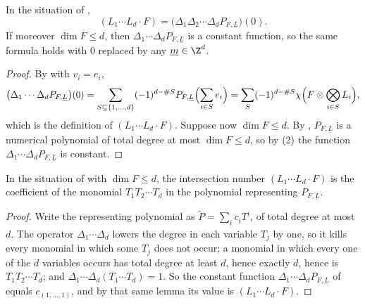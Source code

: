 \begin{lemma}\label{lem:deg-intersection-is-top-difference}
In the situation of ,
\[
  (L_1\cdots L_d\cdot F)=
  \bigl(\Delta_1\Delta_2\cdots\Delta_dP_{F,\underline L}\bigr)(0).
\]
If moreover $\dim F\leq d$, then $\Delta_1\cdots\Delta_dP_{F,\underline L}$ is
a constant function, so the same formula holds with $0$ replaced by any
$\underline m\in\Z^d$.
\end{lemma}
\begin{proof}
By  with $v_i=e_i$,
\[
  \bigl(\Delta_1\cdots\Delta_dP_{F,\underline L}\bigr)(0)
  =\sum_{S\subseteq\{1,\dots,d\}}(-1)^{d-\#S}P_{F,\underline L}
   \Bigl(\sum_{i\in S}e_i\Bigr)
  =\sum_S(-1)^{d-\#S}\chi\Bigl(F\otimes\bigotimes_{i\in S}L_i\Bigr),
\]
which is the definition of $(L_1\cdots L_d\cdot F)$.  Suppose now
$\dim F\leq d$.  By , $P_{F,\underline L}$ is a numerical
polynomial of total degree at most $\dim F\leq d$, so by
(2) the function
$\Delta_1\cdots\Delta_dP_{F,\underline L}$ is constant.
\end{proof}

\begin{lemma}\label{lem:deg-intersection-top-coefficient}
In the situation of  with $\dim F\leq d$, the
intersection number $(L_1\cdots L_d\cdot F)$ is the coefficient of the monomial
$T_1T_2\cdots T_d$ in the polynomial representing $P_{F,\underline L}$.
\end{lemma}
\begin{proof}
Write the representing polynomial as
$\widetilde P=\sum_{\underline i}c_{\underline i}T^{\underline i}$, of total
degree at most $d$.  The operator $\Delta_1\cdots\Delta_d$ lowers the degree in
each variable $T_j$ by one, so it kills every monomial in which some $T_j$ does
not occur; a monomial in which every one of the $d$ variables occurs has total
degree at least $d$, hence exactly $d$, hence is $T_1T_2\cdots T_d$; and
$\Delta_1\cdots\Delta_d(T_1\cdots T_d)=1$.  So the constant function
$\Delta_1\cdots\Delta_dP_{F,\underline L}$ of
 equals $c_{(1,\dots,1)}$, and by
that same lemma its value is $(L_1\cdots L_d\cdot F)$.
\end{proof}

